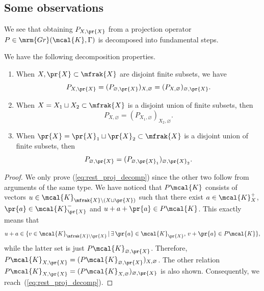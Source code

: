 \subsection{Some observations}
We see that obtaining $P_{X,\pr{X}}$ from a projection operator $P\in\mrm{Gr}(\mcal{K},\Gamma)$ is decomposed into fundamental steps.
\begin{Lemma}
\label{lem:rest_decomp} We have the following decomposition properties.
\begin{enumerate}\itemsep=0pt
\item[$1.$] 	When $X, \pr{X}\subset\mfrak{X}$ are disjoint finite subsets, we have
		\begin{equation}		\label{eq:rest_proj_decomp}
			P_{X,\pr{X}}=(P_{\varnothing,\pr{X}})_{X,\varnothing}=(P_{X,\varnothing})_{\varnothing, \pr{X}}.
		\end{equation}
\item[$2.$] 	When $X=X_{1}\sqcup X_{2}\subset \mfrak{X}$ is a disjoint union of finite subsets, then
		\begin{equation*}
			P_{X,\varnothing}=(P_{X_{1},\varnothing})_{X_{2},\varnothing}.
		\end{equation*}
\item[$3.$] 	When $\pr{X}=\pr{X}_{1}\sqcup \pr{X}_{2}\subset\mfrak{X}$ is a disjoint union of finite subsets, then
		\begin{equation*}
			P_{\varnothing,\pr{X}}=(P_{\varnothing,\pr{X}_{1}})_{\varnothing,\pr{X}_{2}}.
		\end{equation*}
\end{enumerate}
\end{Lemma}
\begin{proof}We only prove (\ref{eq:rest_proj_decomp}) since the other two follow from arguments of the same type.
We have noticed that $P\mcal{K}$ consists of vectors $u\in \mcal{K}_{\mfrak{X}\backslash (X\sqcup\pr{X})}$ such that there exist $a\in \mcal{K}_{X}^{+}$, $\pr{a}\in \mcal{K}_{\pr{X}}^{-}$ and $u+a+\pr{a}\in P\mcal{K}$. This exactly means that
\begin{equation*}
	u+a\in \{v\in \mcal{K}_{\mfrak{X}\backslash \pr{X}}\,|\, \exists\, \pr{a}\in \mcal{K}_{\pr{X}},\, v+\pr{a}\in P\mcal{K}\},
\end{equation*}
while the latter set is just $P\mcal{K}_{\varnothing,\pr{X}}$. Therefore, $P\mcal{K}_{X,\pr{X}}=(P\mcal{K}_{\varnothing,\pr{X}})_{X,\varnothing}$. The other relation $P\mcal{K}_{X,\pr{X}}=(P\mcal{K}_{X,\varnothing})_{\varnothing,\pr{X}}$ is also shown. Consequently, we reach~(\ref{eq:rest_proj_decomp}).
\end{proof}

